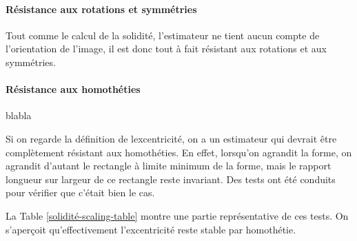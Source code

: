 \documentclass{article}
\theoremstyle{definition}
\begin{document}
	\paragraph{Résistance aux rotations et symmétries}
      
	  Tout comme le calcul de la solidité, l'estimateur ne tient aucun compte de l'orientation de l'image, il est donc tout à fait résistant aux rotations et aux symmétries.
      
	\paragraph{Résistance aux homothéties} blabla
	
	  Si on regarde la définition de lexcentricité, on a un estimateur qui devrait être complètement résistant aux homothéties. En effet, lorsqu'on agrandit la forme, on agrandit d'autant le rectangle à limite minimum de la forme, mais le rapport longueur sur largeur de ce rectangle reste invariant. Des tests ont été conduits pour vérifier que c'était bien le cas.
	  
	  La Table \ref{solidité-scaling-table} montre une partie représentative de ces tests. On s'aperçoit qu'effectivement l'excentricité reste stable par homothétie.\\
	
\end{document}
